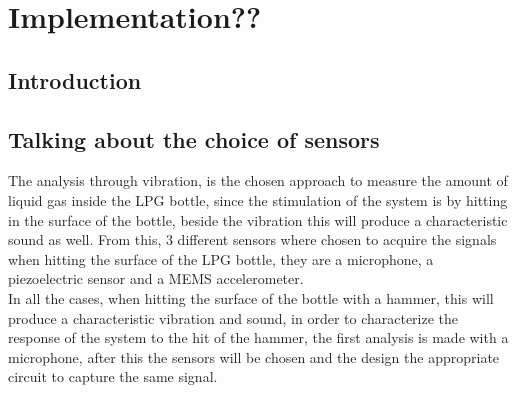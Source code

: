 \cleardoublepage
\chapter{Implementation??} \label{chap:trans}

\section{Introduction}
\section{Talking about the choice of sensors}%
The analysis through vibration, is the chosen approach to measure the amount of liquid gas inside the LPG bottle, since the stimulation of the system is by hitting in the surface of the bottle, beside the vibration this will produce a characteristic sound as well. From this, 3 different sensors where chosen to acquire the signals when hitting the surface of the LPG bottle, they are a microphone, a piezoelectric sensor and a MEMS accelerometer.\\
In all the cases, when hitting the surface of the bottle with a hammer, this will produce a characteristic vibration and sound, in order to characterize the response of the system to the hit of the hammer, the first analysis is made with a microphone, after this the sensors will be chosen and the design the appropriate circuit to capture the same signal.
